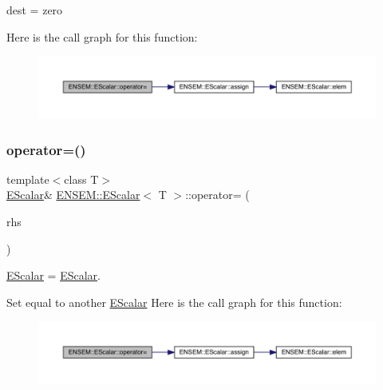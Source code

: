 dest = zero 

Here is the call graph for this function\+:
\nopagebreak
\begin{figure}[H]
\begin{center}
\leavevmode
\includegraphics[width=350pt]{d0/d82/classENSEM_1_1EScalar_a9619fd24baf50fd03986c3056a484cb9_cgraph}
\end{center}
\end{figure}
\mbox{\label{classENSEM_1_1EScalar_ade0daedd37868c24651613bb6f499fd4}} 
\subsubsection{\texorpdfstring{operator=()}{operator=()}\hspace{0.1cm}{\footnotesize\ttfamily [5/8]}}
{\footnotesize\ttfamily template$<$class T$>$ \\
\mbox{\hyperlink{classENSEM_1_1EScalar}{E\+Scalar}}\& \mbox{\hyperlink{classENSEM_1_1EScalar}{E\+N\+S\+E\+M\+::\+E\+Scalar}}$<$ T $>$\+::operator= (\begin{DoxyParamCaption}\item[{const \mbox{\hyperlink{classENSEM_1_1EScalar}{E\+Scalar}}$<$ T $>$ \&}]{rhs }\end{DoxyParamCaption})\hspace{0.3cm}{\ttfamily [inline]}}



\mbox{\hyperlink{classENSEM_1_1EScalar}{E\+Scalar}} = \mbox{\hyperlink{classENSEM_1_1EScalar}{E\+Scalar}}. 

Set equal to another \mbox{\hyperlink{classENSEM_1_1EScalar}{E\+Scalar}} Here is the call graph for this function\+:
\nopagebreak
\begin{figure}[H]
\begin{center}
\leavevmode
\includegraphics[width=350pt]{d0/d82/classENSEM_1_1EScalar_ade0daedd37868c24651613bb6f499fd4_cgraph}
\end{center}
\end{figure}
\mbox{\label{classENSEM_1_1EScalar_ade0daedd37868c24651613bb6f499fd4}} 
